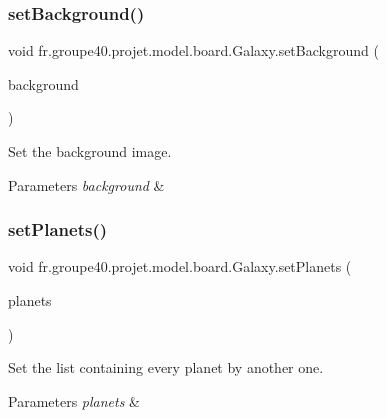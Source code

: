 \subsubsection{\texorpdfstring{set\+Background()}{setBackground()}}
{\footnotesize\ttfamily void fr.\+groupe40.\+projet.\+model.\+board.\+Galaxy.\+set\+Background (\begin{DoxyParamCaption}\item[{Image}]{background }\end{DoxyParamCaption})}



Set the background image. 


\begin{DoxyParams}{Parameters}
{\em background} & \\
\hline
\end{DoxyParams}
\mbox{\label{classfr_1_1groupe40_1_1projet_1_1model_1_1board_1_1_galaxy_a7f400bf11202afef051fccbc9cc727a9}} 
\subsubsection{\texorpdfstring{set\+Planets()}{setPlanets()}}
{\footnotesize\ttfamily void fr.\+groupe40.\+projet.\+model.\+board.\+Galaxy.\+set\+Planets (\begin{DoxyParamCaption}\item[{Array\+List$<$ \mbox{\hyperlink{classfr_1_1groupe40_1_1projet_1_1model_1_1planets_1_1_planet}{Planet}} $>$}]{planets }\end{DoxyParamCaption})}



Set the list containing every planet by another one. 


\begin{DoxyParams}{Parameters}
{\em planets} & \\
\hline
\end{DoxyParams}
\mbox{\label{classfr_1_1groupe40_1_1projet_1_1model_1_1board_1_1_galaxy_a598d42d4b1e24f23d1e004a2e69c8959}} 
